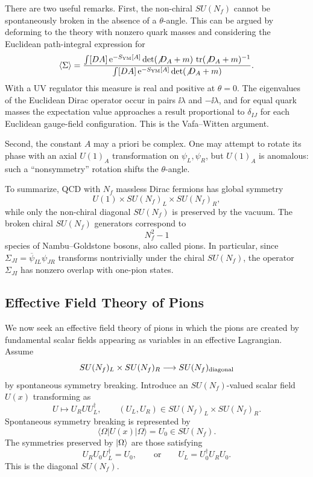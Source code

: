 There are two useful remarks.  First, the non-chiral \(SU(N_f)\) cannot
be spontaneously broken in the absence of a \(\theta\)-angle.  This can
be argued by deforming to the theory with nonzero quark masses and
considering the Euclidean path-integral expression for
\[
  \langle\Sigma\rangle
  =
  \frac{
    \int[DA]\,\mathrm{e}^{-S_{\rm YM}[A]}\det(\not D_A+m)\,
    \operatorname{tr}(\not D_A+m)^{-1}
  }{
    \int[DA]\,\mathrm{e}^{-S_{\rm YM}[A]}\det(\not D_A+m)
  }.
\]
With a UV regulator this measure is real and positive at \(\theta=0\).
The eigenvalues of the Euclidean Dirac operator occur in pairs
\(\ii\lambda\) and \(-\ii\lambda\), and for equal quark masses the
expectation value approaches a result proportional to \(\delta_{IJ}\) for
each Euclidean gauge-field configuration.  This is the Vafa--Witten
argument.

Second, the constant \(A\) may a priori be complex.  One may attempt to
rotate its phase with an axial \(U(1)_A\) transformation on
\(\psi_L,\psi_R\), but \(U(1)_A\) is anomalous: such a ``nonsymmetry''
rotation shifts the \(\theta\)-angle.

To summarize, QCD with \(N_f\) massless Dirac fermions has global
symmetry
\[
  U(1)\times SU(N_f)_L\times SU(N_f)_R,
\]
while only the non-chiral diagonal \(SU(N_f)\) is preserved by the
vacuum.  The broken chiral \(SU(N_f)\) generators correspond to
\[
  N_f^2-1
\]
species of Nambu--Goldstone bosons, also called pions.  In particular,
since \(\Sigma_{JI}=\overline\psi_{IL}\psi_{JR}\) transforms
nontrivially under the chiral \(SU(N_f)\), the operator \(\Sigma_{JI}\)
has nonzero overlap with one-pion states.

\subsection{Effective Field Theory of Pions}

We now seek an effective field theory of pions in which the pions are
created by fundamental scalar fields appearing as variables in an
effective Lagrangian.  Assume
\[
  SU(N_f)_L\times SU(N_f)_R
  \longrightarrow
  SU(N_f)_{\rm diagonal}
\]
by spontaneous symmetry breaking.  Introduce an \(SU(N_f)\)-valued scalar
field \(U(x)\) transforming as
\[
  U\longmapsto U_R U U_L^\dagger,
  \qquad
  (U_L,U_R)\in SU(N_f)_L\times SU(N_f)_R.
\]
Spontaneous symmetry breaking is represented by
\[
  \langle\Omega|U(x)|\Omega\rangle=U_0\in SU(N_f).
\]
The symmetries preserved by \(\ket\Omega\) are those satisfying
\[
  U_RU_0U_L^\dagger=U_0,
  \qquad\text{or}\qquad
  U_L=U_0^\dagger U_RU_0.
\]
This is the diagonal \(SU(N_f)\).

